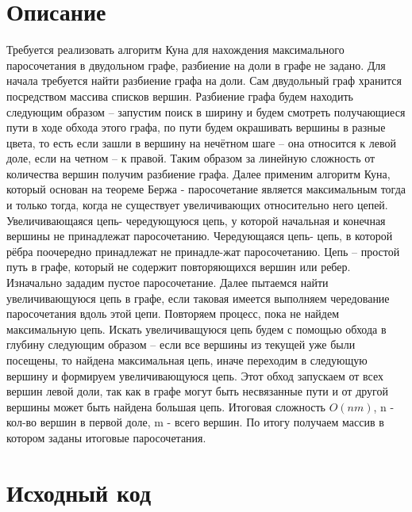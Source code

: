 \section{Описание}
Требуется реализовать алгоритм Куна для нахождения максимального паросочетания в двудольном графе, разбиение на доли в графе не задано. Для начала требуется найти разбиение графа на доли. Сам двудольный граф хранится посредством массива списков вершин. Разбиение графа будем находить следующим образом – запустим поиск в ширину и будем смотреть получающиеся пути в ходе обхода этого графа, по пути будем окрашивать вершины в разные цвета, то есть если зашли в вершину на нечётном шаге – она относится к левой доле, если на четном – к правой. Таким образом за линейную сложность от количества вершин получим разбиение графа. Далее применим алгоритм Куна, который основан на теореме Бержа - паросочетание является максимальным тогда и только тогда, когда не существует увеличивающих относительно него цепей. Увеличивающаяся цепь- чередующуюся цепь, у которой начальная и конечная вершины не принадлежат паросочетанию. Чередующаяся цепь- цепь, в которой рёбра поочередно принадлежат не принадле-жат паросочетанию. Цепь – простой путь в графе, который не содержит повторяющихся вершин или ребер. Изначально зададим пустое паросочетание. Далее пытаемся найти увеличивающуюся цепь в графе, если таковая имеется выполняем чередование паросочетания вдоль этой цепи. Повторяем процесс, пока не найдем максимальную цепь. Искать увеличиващуюся цепь будем с помощью обхода в глубину следующим образом – если все вершины из текущей уже были посещены, то найдена максимальная цепь, иначе переходим в следующую вершину и формируем увеличивающуюся цепь. Этот обход запускаем от всех вершин левой доли, так как в графе могут быть несвязанные пути и от другой вершины может быть найдена большая цепь. Итоговая сложность $O(nm)$, n - кол-во вершин в первой доле, m - всего вершин. По итогу получаем массив в котором заданы итоговые паросочетания.

\pagebreak

\section{Исходный код}


